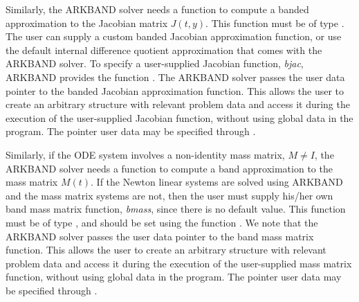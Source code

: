 \documentclass[letterpaper,10pt,english]{sphinxmanual}
\begin{document}
Similarly, the ARKBAND solver needs a function to compute a banded
approximation to the Jacobian matrix \(J(t,y)\). This function
must be of type {\hyperref[c_interface/User_supplied:c.ARKDlsBandJacFn]{\emph{}}}. The user can supply a
custom banded Jacobian approximation function, or use the default
internal difference quotient approximation that comes with the ARKBAND
solver. To specify a user-supplied Jacobian function, \emph{bjac},
ARKBAND provides the function {\hyperref[c_interface/User_callable:c.ARKDlsSetBandJacFn]{\emph{}}}. The
ARKBAND solver passes the user data pointer to the banded Jacobian
approximation function.  This allows the user to create an arbitrary
structure with relevant problem data and access it during the
execution of the user-supplied Jacobian function, without using global
data in the program. The pointer user data may be specified through
{\hyperref[c_interface/User_callable:c.ARKodeSetUserData]{\emph{}}}.

Similarly, if the ODE system involves a non-identity mass matrix,
\(M\ne I\), the ARKBAND solver needs a function to compute a
band approximation to the mass matrix \(M(t)\). If the Newton
linear systems are solved using ARKBAND and the mass matrix systems
are not, then the user must supply his/her own band mass matrix
function, \emph{bmass}, since there is no default value.  This function
must be of type {\hyperref[c_interface/User_supplied:c.ARKDlsBandMassFn]{\emph{}}}, and should be set using
the function {\hyperref[c_interface/User_callable:c.ARKDlsSetBandMassFn]{\emph{}}}.  We note that the
ARKBAND solver passes the user data pointer to the band mass matrix
function. This allows the user to create an arbitrary structure with
relevant problem data and access it during the execution of the
user-supplied mass matrix function, without using global data in the
program. The pointer user data may be specified through
{\hyperref[c_interface/User_callable:c.ARKodeSetUserData]{\emph{}}}.
\end{document}
